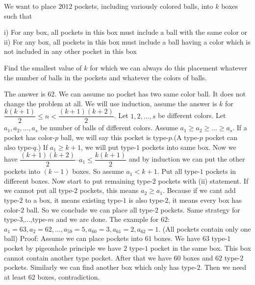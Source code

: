 \documentclass{subfile}
\begin{document}
		\begin{problem}
		    We want to place $2012$ pockets, including variously colored balls, into $k$ boxes such that

            i) For any box, all pockets in this box must include a ball with the same color
            or
            ii) For any box, all pockets in this box must include a ball having a color which is not included in any other pocket in this box
            
            Find the smallest value of $k$ for which we can always do this placement whatever the number of balls in the pockets and whatever the colors of balls.
        \end{problem}
        
        \begin{solution}
            The answer is $62$.
            We can assume no pocket has two same color ball. It does not change the problem at all.
            We will use induction, assume the answer is $k$ for $\dfrac{k(k+1)}{2}\leq n <\dfrac{(k+1)(k+2)}{2}$. Let $1,2,…,s$ be different colors. Let $a_1,a_2, ... ,a_s$ be number of balls of different colors. Assume $a_1\geq a_2\geq ... \geq a_s$.
            If a pocket has color-$p$ ball, we will say this pocket is type-$p$.(A type-$p$ pocket can also type-$q$.)
            If $a_1 \geq k+1$, we will put type-$1$ pockets into same box. Now we have $\dfrac{(k+1)(k+2)}{2}–a_1\leq \dfrac{k(k+1)}{2}$ and by induction we can put the other pockets into $(k-1)$ boxes. So assume $a_1<k+1$. Put all type-$1$ pockets in different boxes. Now start to put remaining type-$2$ pockets with (ii) statement. If we cannot put all type-$2$ pockets, this means $a_2\geq a_1$. Because if we cant add type-$2$ to a box, it means existing type-$1$ is also type-$2$, it means every box has color-$2$ ball. So we conclude we can place all type-$2$ pockets. Same strategy for type-$3$,...,type-$m$ and we are done.
            The example for $62$:
            $a_1 = 63, a_2 = 62,..., a_{59} = 5, a_{60} = 3, a_{61} = 2, a_{62} = 1$. (All pockets contain only one ball)
            Proof: Assume we can place pockets into $61$ boxes. We have $63$ type-$1$ pocket by pigeonhole principle we have $2$ type-$1$ pocket in the same box. This box cannot contain another type pocket. After that we have $60$ boxes and $62$ type-$2$ pockets. Similarly we can find another box which only has type-$2$. Then we need at least 62 boxes, contradiction.
        \end{solution}
		\newpage
		
\end{document}
